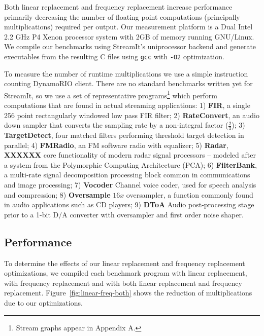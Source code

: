 Both linear replacement and frequency replacement increase performance primarily
decreasing the number of floating point computations (principally multiplications) 
required per output.
Our measurement platform is a Dual Intel 2.2 GHz P4 Xenon processor system 
with 2GB of memory running GNU/Linux. We compile our benchmarks using StreamIt's uniprocessor backend
and generate executables from the resulting C files using {\tt gcc} with {\tt -O2} optimization.

To measure the number of runtime multiplications we use a simple instruction counting 
DynamoRIO\cite{dynamo99} client.
There are no standard benchmarks written yet for StreamIt, so we use
a set of representative programs\footnote{Stream graphs appear in Appendix A.}
which perform computations that 
are found in actual streaming applications: 
1) {\bf FIR}, a single 256 point rectangularly windowed low pass FIR filter; 
2) {\bf RateConvert}, an audio down sampler that converts the 
sampling rate by a non-integral factor ($\frac{2}{3}$); 
3) {\bf TargetDetect}, four matched filters performing threshold target detection in parallel; 
4) {\bf FMRadio}, an FM software radio with equalizer;
5) {\bf Radar}, {\bf XXXXXX} core functionality of modern radar signal processors -- modeled after a 
system from the Polymorphic Computing Architecture (PCA);
6) {\bf FilterBank}, a multi-rate signal decomposition 
processing block common in communications and image processing; 
7) {\bf Vocoder} Channel voice coder, used for speech analysis and compression;
8) {\bf Oversample} $16x$ oversampler, a function commonly found in audio applications 
such as CD players;
9) {\bf DToA} Audio post-processing stage prior to a 1-bit D/A converter 
with oversampler and first order noise shaper.

\subsection{Performance}

To determine the effects of our linear replacement and frequency
replacement optimizations, we compiled each benchmark program with
linear replacement, with frequency replacement and with both linear
replacement and frequency replacement.
Figure~\ref{fig:linear-freq-both} shows the reduction of
multiplications due to our optimizations.


